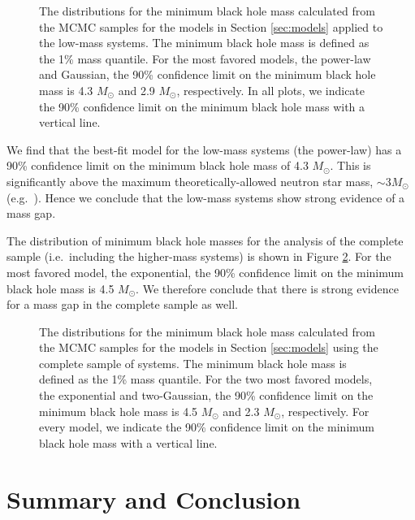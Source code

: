 \documentclass[preprint]{aastex}
\newcommand{\Msun}{M_\odot}
\begin{document}
\begin{figure}
  \begin{center}
  \end{center}
  \caption{\label{fig:min-mass} The distributions for the minimum
    black hole mass calculated from the MCMC samples for the models in
    Section \ref{sec:models} applied to the low-mass systems.  The
    minimum black hole mass is defined as the 1\% mass quantile.  For
    the most favored models, the power-law and Gaussian, the 90\%
    confidence limit on the minimum black hole mass is 4.3 $\Msun$ and
    2.9 $\Msun$, respectively.  In all plots, we indicate the 90\%
    confidence limit on the minimum black hole mass with a vertical
    line.}
\end{figure}

We find that the best-fit model for the low-mass systems (the
power-law) has a 90\% confidence limit on the minimum black hole mass
of 4.3 $\Msun$.  This is significantly above the maximum
theoretically-allowed neutron star mass, $\sim 3 \Msun$ (e.g.\
\citet{Kalogera1996}).  Hence we conclude that the low-mass systems
show strong evidence of a mass gap.

The distribution of minimum black hole masses for the analysis of the
complete sample (i.e.\ including the higher-mass systems) is shown in
Figure \ref{fig:high-min-mass}.  For the most favored model, the
exponential, the 90\% confidence limit on the minimum black hole mass
is 4.5 $\Msun$.  We therefore conclude that there is strong evidence
for a mass gap in the complete sample as well.

\begin{figure}
\begin{center}
  \end{center}
  \caption{\label{fig:high-min-mass} The distributions for the minimum
    black hole mass calculated from the MCMC samples for the models in
    Section \ref{sec:models} using the complete sample of systems.
    The minimum black hole mass is defined as the 1\% mass quantile.
    For the two most favored models, the exponential and two-Gaussian,
    the 90\% confidence limit on the minimum black hole mass is 4.5
    $\Msun$ and 2.3 $\Msun$, respectively.  For every model, we
    indicate the 90\% confidence limit on the minimum black hole mass
    with a vertical line.}
\end{figure}

\section{Summary and Conclusion}
\end{document}
